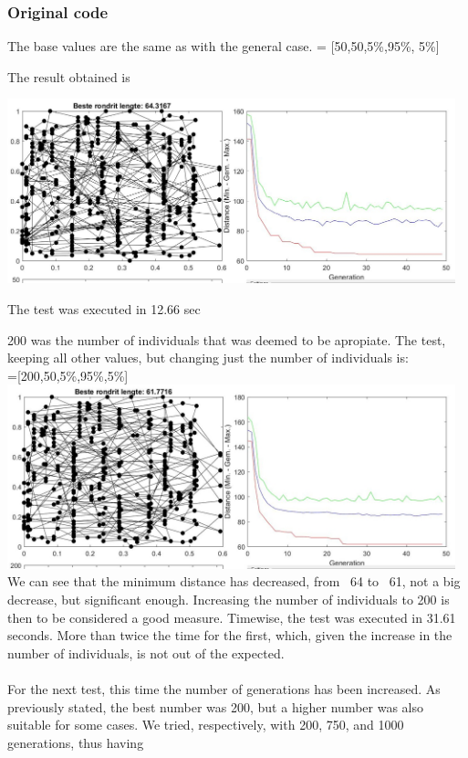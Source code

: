 \subsubsection{Original code}

The base values are the same as with the general case.
 = [50,50,5\%,95\%, 5\%\big]

The result obtained is

\includegraphics[width=13cm]{img/specific/xalt_edges/general_1.jpg}

The test was executed in 12.66 sec

200 was the number of individuals that was deemed to be apropiate. 
The test, keeping all other values, but changing just the number of
individuals is:
\\
 =[200,50,5\%,95\%,5\%] \\
\includegraphics[width=13cm]{img/specific/xalt_edges/general_2.jpg}\\
We can see that the minimum distance has decreased, from ~64 to ~61, not a
big decrease, but significant enough. Increasing the number of
individuals to 200 is then to be considered a good measure. Timewise, the test was executed in 31.61 seconds. More than twice the time for the
first, which, given the increase in the number of individuals, is not out of
the expected. \\
\\
For the next test, this time the number of generations has been
increased. As previously stated, the best number was 200, but a higher number
was also suitable for some cases. We tried, respectively, with 200, 750, and
1000 generations, thus having\\

